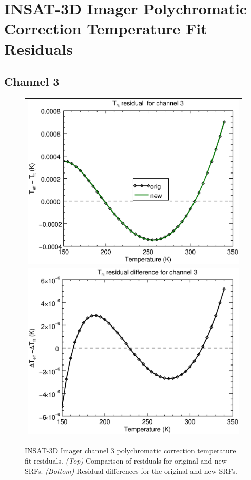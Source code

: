 \section{INSAT-3D Imager Polychromatic Correction Temperature Fit Residuals}
\label{app.imgr_tfit_data_plots}

\subsection{Channel 3}
\begin{figure}[H]
  \centering
  \begin{tabular}{c}
    \includegraphics[scale=0.55]{graphics/imgr/tfit/imgr_insat3d-3.tfit.eps} \\
    \includegraphics[scale=0.55]{graphics/imgr/tfit/imgr_insat3d-3.tfit.difference.eps}
  \end{tabular}
  \caption{INSAT-3D Imager channel 3 polychromatic correction temperature fit residuals. \emph{(Top)} Comparison of residuals for original and new SRFs. \emph{(Bottom)} Residual differences for the original and new SRFs.}
  \label{fig:imgr_ch3_tfit}
\end{figure}


